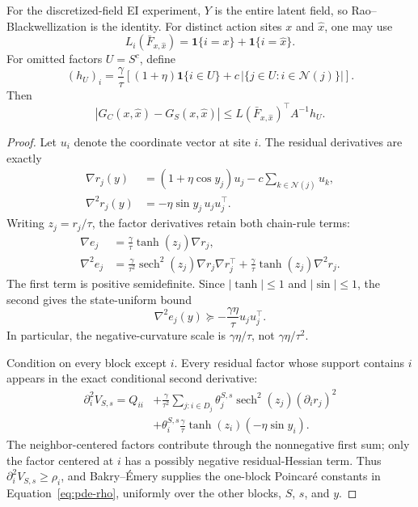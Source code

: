 For the discretized-field EI experiment, $Y$ is the entire latent field, so
Rao--Blackwellization is the identity.  For distinct action sites $x$ and
$\widehat x$, one may use
\[
    L_i(\bar F_{x,\widehat x})
    =\mathbf 1\{i=x\}+\mathbf 1\{i=\widehat x\}.
\]
For omitted factors $U=S^c$, define
\begin{equation}
    (h_U)_i
    =\frac{\gamma}{\tau}\left[
      (1+\eta)\mathbf 1\{i\in U\}
      +c\,|\{j\in U:i\in\mathcal N(j)\}|
    \right].
    \label{eq:pde-omitted-load}
\end{equation}
Then
\begin{equation}
    |G_C(x,\widehat x)-G_S(x,\widehat x)|
    \le
    L(\bar F_{x,\widehat x})^\top A^{-1}h_U.
    \label{eq:pde-ei-structural-bound}
\end{equation}

\begin{proof}
Let $u_i$ denote the coordinate vector at site $i$.  The residual derivatives
are exactly
\begin{align}
    \nabla r_j(y)
    &=(1+\eta\cos y_j)u_j
      -c\sum_{k\in\mathcal N(j)}u_k,
    \label{eq:pde-residual-gradient}\\
    \nabla^2r_j(y)
    &=-\eta\sin y_j\,u_j u_j^\top.
    \label{eq:pde-residual-hessian}
\end{align}
Writing $z_j=r_j/\tau$, the factor derivatives retain both chain-rule terms:
\begin{align}
    \nabla e_j
    &=\frac{\gamma}{\tau}\tanh(z_j)\nabla r_j,
    \label{eq:pde-factor-gradient}\\
    \nabla^2e_j
    &=\frac{\gamma}{\tau^2}\operatorname{sech}^2(z_j)
      \nabla r_j\nabla r_j^\top
      +\frac{\gamma}{\tau}\tanh(z_j)\nabla^2r_j.
    \label{eq:pde-factor-hessian}
\end{align}
The first term is positive semidefinite.  Since $|\tanh|\le1$ and
$|\sin|\le1$, the second gives the state-uniform bound
\begin{equation}
    \nabla^2e_j(y)
    \succeq-\frac{\gamma\eta}{\tau}u_j u_j^\top.
    \label{eq:pde-negative-curvature}
\end{equation}
In particular, the negative-curvature scale is $\gamma\eta/\tau$, not
$\gamma\eta/\tau^2$.

Condition on every block except $i$.  Every residual factor whose support
contains $i$ appears in the exact conditional second derivative:
\begin{align*}
    \partial_i^2V_{S,s}
    =Q_{ii}
    &+\frac{\gamma}{\tau^2}
      \sum_{j:i\in D_j}\theta_j^{S,s}
      \operatorname{sech}^2(z_j)(\partial_i r_j)^2\\
    &+\theta_i^{S,s}\frac{\gamma}{\tau}
      \tanh(z_i)(-\eta\sin y_i).
\end{align*}
The neighbor-centered factors contribute through the nonnegative first sum;
only the factor centered at $i$ has a possibly negative residual-Hessian term.
Thus $\partial_i^2V_{S,s}\ge\rho_i$, and Bakry--\'Emery supplies the one-block
Poincar\'e constants in Equation~\eqref{eq:pde-rho}, uniformly over the other
blocks, $S$, $s$, and $y$.


\end{proof}
